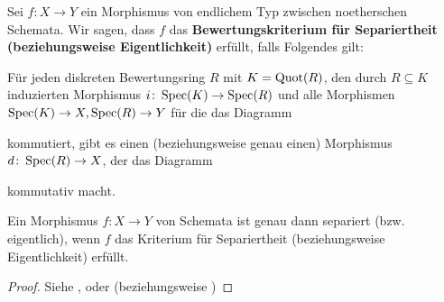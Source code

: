 \begin{bem}
	\label{bem:10.6}
	Sei $f\colon X \to Y$ ein Morphismus von endlichem Typ zwischen noetherschen Schemata.
	Wir sagen, dass $f$ das \textbf{Bewertungskriterium für Separiertheit (beziehungsweise Eigentlichkeit)} erfüllt, falls Folgendes gilt:
		
	Für jeden diskreten Bewertungsring $R$ mit $K = \operatorname{Quot}(R)$, den durch $R \subseteq K$ induzierten Morphismus $i \colon \operatorname{Spec}(K) \to \operatorname{Spec}(R)$ und alle Morphismen $\operatorname{Spec}(K) \to X, \operatorname{Spec}(R) \to Y$ für die das Diagramm
	\begin{center}
	\end{center}
	kommutiert, gibt es einen (beziehungsweise genau einen) Morphismus $d \colon \operatorname{Spec}(R) \to X$, der das Diagramm
	\begin{center}
	\end{center}
	kommutativ macht.
\end{bem}

\begin{thm}
	\label{thm:10.7}
	Ein Morphismus $f \colon X \to Y$ von Schemata ist genau dann separiert (bzw. eigentlich), wenn $f$ das Kriterium für Separiertheit (beziehungsweise Eigentlichkeit) erfüllt.
	\begin{proof}
		Siehe \cite[7.2.3]{grothendieck1971elements}, oder \cite[Theorem 15.9]{goertz2010algebraic} (beziehungsweise \cite[Theorem 7.3.8]{grothendieck1971elements})
	\end{proof}
\end{thm}

